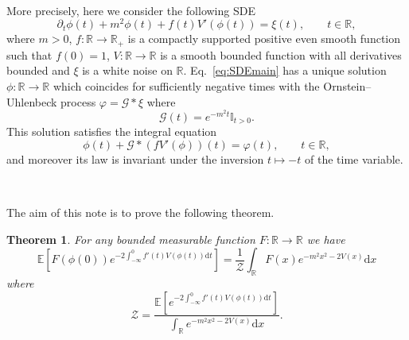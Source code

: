 \documentclass[a4paper,10pt]{article}
\newcommand{\mathd}{\mathrm{d}}
\newtheorem{theorem}{Theorem}
\begin{document}
\

More precisely, here we consider the following SDE
\begin{equation}
  \partial_t \phi (t) + m^2 \phi (t) + f (t) V' (\phi (t)) = \xi (t)
  \label{eq:SDEmain}, \qquad t \in \mathbb{R},
\end{equation}
where $m > 0$, $f : \mathbb{R} \rightarrow \mathbb{R}_+$ is a compactly
supported positive even smooth function such that $f (0) = 1$, $V : \mathbb{R}
\rightarrow \mathbb{R}$ is a smooth bounded function with all derivatives
bounded and $\xi$ is a white noise on $\mathbb{R}$. Eq.~{\eqref{eq:SDEmain}}
has a unique solution $\phi : \mathbb{R} \rightarrow \mathbb{R}$ which
coincides for sufficiently negative times with the Ornstein--Uhlenbeck process
$\varphi = \mathcal{G} \ast \xi$ where
\[ \mathcal{G} (t) = e^{- m^2 t} \mathbb{I}_{t > 0} . \]
This solution satisfies the integral equation
\begin{equation}
  \phi (t) + \mathcal{G} \ast (f V' (\phi)) (t) = \varphi (t),
  \label{eq:main2} \qquad t \in \mathbb{R},
\end{equation}
and moreover its law is invariant under the inversion $t \mapsto - t$ of the
time variable.

\

The aim of this note is to prove the following theorem.

\begin{theorem}
  \label{theorem_main}For any bounded measurable function $F : \mathbb{R}
  \rightarrow \mathbb{R}$ we have
  \[ \mathbb{E} \left[ F (\phi (0)) e^{- 2 \int_{- \infty}^0 f' (t) V (\phi
     (t)) \mathd t} \right] = \frac{\mathcal{} 1}{\mathcal{Z}} \left.
     \int_{\mathbb{R}} F (x) e^{- m^2 x^2 - 2 V (x)} \mathd x \right. \]
  where
  \[ \mathcal{Z}= \frac{\mathbb{E} \left[ e^{- 2 \int_{- \infty}^0 f' (t) V
     (\phi (t)) \mathd t} \right]}{\int_{\mathbb{R}} e^{- m^2 x^2 - 2 V (x)}
     \mathd x} . \]
\end{theorem}
\end{document}
